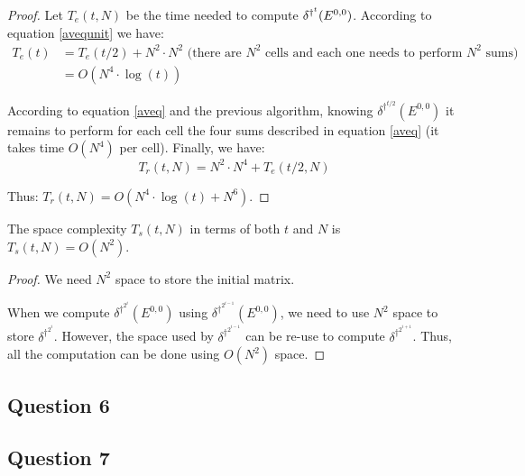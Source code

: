\begin{proof}
  Let $T_e(t,N)$ be the time needed to compute $\delta^{\dag^t}(E^{0,0})$. According to equation \ref{avequnit} we have:
 \[\begin{split}
    T_e(t) & = T_e(t/2) + N^2 \cdot N^2 \text{ (there are } N^2 \text{ cells and each one needs to perform } N^2 \text{ sums)} \\
         & = O(N^4 \cdot \log(t))
   \end{split}
\]  
  
  According to equation \ref{aveq} and the previous algorithm, knowing $\delta^{\dag^{t/2}}(E^{0,0})$ it remains to perform for each cell the four sums described in equation \ref{aveq} (it takes time $O(N^4)$ per cell). Finally, we have:
  \[ T_r(t,N) = N^2 \cdot N^4 + T_e(t/2,N)\]
  
  Thus: $T_r(t,N) = O(N^4 \cdot \log(t) + N^6)$.
\end{proof}

\begin{prop}
 The space complexity $T_s(t,N)$ in terms of both $t$ and $N$ is $T_s(t,N) = O(N^2)$.
\end{prop}

\begin{proof}
 We need $N^2$ space to store the initial matrix.

 When we compute $\delta^{\dag^{2^i}}(E^{0,0})$ using $\delta^{\dag^{2^{i-1}}}(E^{0,0})$, we need to use $N^2$ space to store $\delta^{\dag^{2^i}}$. However, the space used by $\delta^{\dag^{2^{i-1}}}$ can be re-use to compute $\delta^{\dag^{2^{i+1}}}$. Thus, all the computation can be done using $O(N^2)$ space.
\end{proof}



\subsection*{Question 6}


\subsection*{Question 7}

